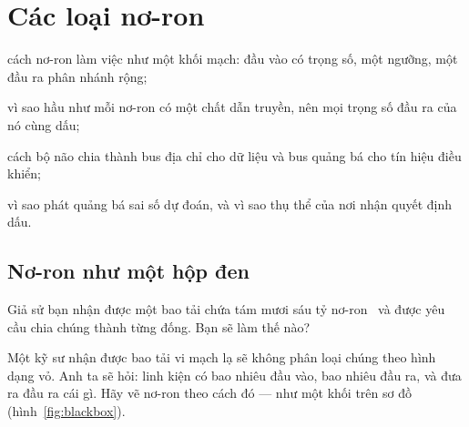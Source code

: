 \chapter{Các loại nơ-ron}
\label{sec:neurontypes}
\begin{chaptergoals}
\item cách nơ-ron làm việc như một khối mạch: đầu vào có trọng số, một ngưỡng, một đầu ra phân nhánh rộng;
\item vì sao hầu như mỗi nơ-ron có một chất dẫn truyền, nên mọi trọng số đầu ra của nó cùng dấu;
\item cách bộ não chia thành bus địa chỉ cho dữ liệu và bus quảng bá cho tín hiệu điều khiển;
\item vì sao  phát quảng bá sai số dự đoán, và vì sao thụ thể của nơi nhận quyết định dấu.
\end{chaptergoals}

\section{Nơ-ron như một hộp đen}

Giả sử bạn nhận được một bao tải chứa tám mươi sáu tỷ nơ-ron~\cite{Azevedo2009} và được yêu cầu chia chúng thành từng đống. Bạn sẽ làm thế nào?

Một kỹ sư nhận được bao tải vi mạch lạ sẽ không phân loại chúng theo hình dạng vỏ. Anh ta sẽ hỏi: linh kiện có bao nhiêu đầu vào, bao nhiêu đầu ra, và đưa ra đầu ra cái gì. Hãy vẽ nơ-ron theo cách đó --- như một khối trên sơ đồ (hình~\ref{fig:blackbox}).


